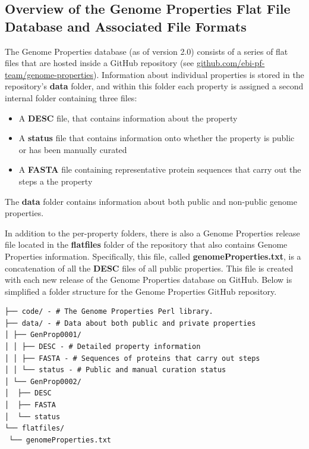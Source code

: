 \subsection{Overview of the Genome Properties Flat File Database and Associated File Formats} \label{Genome-Properties-Files} 

The Genome Properties database (as of version 2.0) consists of a series of flat files that are hosted inside a GitHub repository (see \href{http://github.com/ebi-pf-team/genome-properties}{github.com/ebi-pf-team/genome-properties}). Information about individual properties is stored in the repository's \textbf{data} folder, and within this folder each property is assigned a second internal folder containing three files: 

\begin{itemize}
\item A \textbf{DESC} file, that contains information about the property
\item A \textbf{status} file that contains information onto whether the property is public or has been manually curated
\item A \textbf{FASTA} \cite{pearson19905} file containing representative protein sequences that carry out the steps a the property
\end{itemize}

The \textbf{data} folder contains information about both public and non-public genome properties. 

In addition to the per-property folders, there is also a Genome Properties release file located in the \textbf{flatfiles} folder of the repository that also contains Genome Properties information. Specifically, this file, called \textbf{genomeProperties.txt}, is a concatenation of all the \textbf{DESC} files of all public properties. This file is created with each new release of the Genome Properties database on GitHub. Below is simplified a folder structure for the Genome Properties GitHub repository.

\begin{verbatim}
├── code/ - # The Genome Properties Perl library.
├── data/ - # Data about both public and private properties
│ ├── GenProp0001/
│ │ ├── DESC - # Detailed property information
│ │ ├── FASTA - # Sequences of proteins that carry out steps
│ │ └── status - # Public and manual curation status
│ └── GenProp0002/
│  ├── DESC
│  ├── FASTA
│  └── status
└── flatfiles/
 └── genomeProperties.txt
\end{verbatim}

